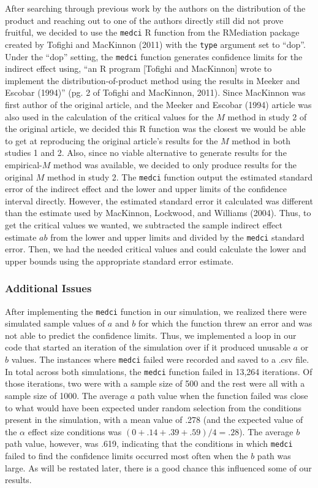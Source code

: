 \documentclass[10,a4paperpaper,]{article}
\begin{document}
After searching through previous work by the authors on the distribution
of the product and reaching out to one of the authors directly still did
not prove fruitful, we decided to use the \texttt{medci} R function from
the RMediation package created by Tofighi and MacKinnon (2011) with the
\texttt{type} argument set to ``dop''. Under the ``dop'' setting, the
\texttt{medci} function generates confidence limits for the indirect
effect using, ``an R program {[}Tofighi and MacKinnon{]} wrote to
implement the distribution-of-product method using the results in Meeker
and Escobar (1994)'' (pg. 2 of Tofighi and MacKinnon, 2011). Since
MacKinnon was first author of the original article, and the Meeker and
Escobar (1994) article was also used in the calculation of the critical
values for the \(M\) method in study 2 of the original article, we
decided this R function was the closest we would be able to get at
reproducing the original article's results for the \(M\) method in both
studies 1 and 2. Also, since no viable alternative to generate results
for the empirical-\(M\) method was available, we decided to only produce
results for the original \(M\) method in study 2. The \texttt{medci}
function output the estimated standard error of the indirect effect and
the lower and upper limits of the confidence interval directly. However,
the estimated standard error it calculated was different than the
estimate used by MacKinnon, Lockwood, and Williams (2004). Thus, to get
the critical values we wanted, we subtracted the sample indirect effect
estimate \(ab\) from the lower and upper limits and divided by the
\texttt{medci} standard error. Then, we had the needed critical values
and could calculate the lower and upper bounds using the appropriate
standard error estimate.

\subsubsection{Additional Issues}

After implementing the \texttt{medci} function in our simulation, we
realized there were simulated sample values of \(a\) and \(b\) for which
the function threw an error and was not able to predict the confidence
limits. Thus, we implemented a loop in our code that started an
iteration of the simulation over if it produced unusable \(a\) or \(b\)
values. The instances where \texttt{medci} failed were recorded and
saved to a .csv file. In total across both simulations, the
\texttt{medci} function failed in 13,264 iterations. Of those
iterations, two were with a sample size of 500 and the rest were all
with a sample size of 1000. The average \(a\) path value when the
function failed was close to what would have been expected under random
selection from the conditions present in the simulation, with a mean
value of .278 (and the expected value of the \(\alpha\) effect size
conditions was \((0+.14+.39+.59)/4=.28\)). The average \(b\) path value,
however, was .619, indicating that the conditions in which
\texttt{medci} failed to find the confidence limits occurred most often
when the \(b\) path was large. As will be restated later, there is a
good chance this influenced some of our results.
\end{document}
